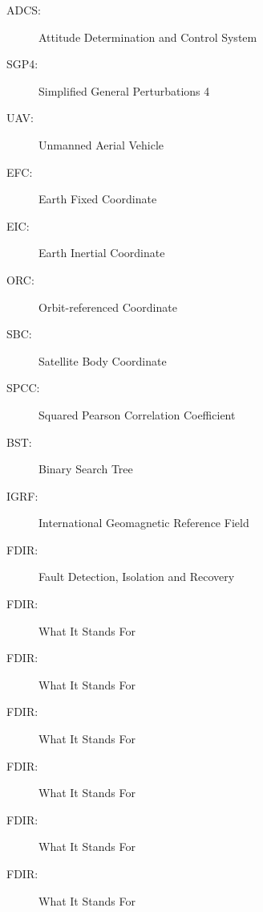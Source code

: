 

\ifoddmakenewpage




%
%


\listofacronyms %


\begin{description}
\item[ADCS:] Attitude Determination and Control System
\item[SGP4:] Simplified General Perturbations 4
\item[UAV:] Unmanned Aerial Vehicle
\item[EFC:] Earth Fixed Coordinate
\item[EIC:] Earth Inertial Coordinate
\item[ORC:] Orbit-referenced Coordinate 
\item[SBC:] Satellite Body Coordinate
\item[SPCC:] Squared Pearson Correlation Coefficient
\item[BST:] Binary Search Tree
\item[IGRF:] International Geomagnetic Reference Field
\item[FDIR:] Fault Detection, Isolation and Recovery
\item[FDIR:] What It Stands For
\item[FDIR:] What It Stands For
\item[FDIR:] What It Stands For
\item[FDIR:] What It Stands For
\item[FDIR:] What It Stands For
\item[FDIR:] What It Stands For

\end{description}





\ifoddmakenewpage




%
%

\listoffigures
\ifoddmakenewpage
\listoftables
\ifoddmakenewpage
\listofalgorithms
\ifoddmakenewpage
